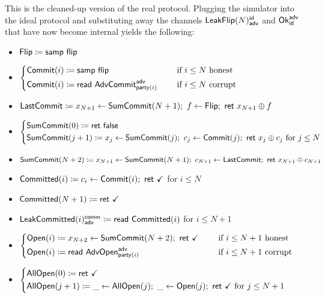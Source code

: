 \noindent This is the cleaned-up version of the real protocol. Plugging the simulator into the ideal protocol and substituting away the channels $\mathsf{LeakFlip}(N)^{\mathsf{id}}_{\mathsf{adv}}$ and $\mathsf{Ok}^{\mathsf{adv}}_{\mathsf{id}}$ that have now become internal yields the following:

\begin{itemize}
\item $\mathsf{Flip} \coloneqq \mathsf{samp} \ \mathsf{flip}$
\item {\color{blue} $\begin{cases*} \Commit(i) \coloneqq \samp{\flip} & \hspace{10pt} \text{if $i \leq N$ honest} \\ \Commit(i) \coloneqq \read{\AdvCommit^\adv_{\party(i)}} & \hspace{10pt} \text{if $i \leq N$ corrupt} \end{cases*}$}
\item {\color{blue} $\mathsf{LastCommit} \coloneqq x_{N+1} \leftarrow \mathsf{SumCommit}(N+1); \ f \leftarrow \mathsf{Flip}; \ \mathsf{ret} \ x_{N+1} \oplus f$}
\item {\color{blue} $\begin{cases*} \SumCommit(0) \coloneqq \ret{\false} \\ \SumCommit(j+1) \coloneqq x_j \leftarrow \SumCommit(j); \ c_j \leftarrow \Commit(j); \ \ret{x_j \oplus c_j} \text{ for $j \leq N$} \end{cases*}$}
\item {\color{blue} $\SumCommit(N+2) \coloneqq x_{N+1} \leftarrow \SumCommit(N+1); \ c_{N+1} \leftarrow \LastCommit; \ \ret{x_{N+1} \oplus c_{N+1}}$}
\item {\color{magenta} $\mathsf{Committed}(i) \coloneqq c_i \leftarrow \mathsf{Commit}(i); \ \mathsf{ret} \ \checkmark$ for $i \leq N$}
\item {\color{magenta} $\mathsf{Committed}(N+1) \coloneqq \mathsf{ret} \ \checkmark$}
\item {\color{magenta} $\mathsf{LeakCommitted}(i)^{\mathsf{comm}}_{\mathsf{adv}} \coloneqq \mathsf{read} \ \mathsf{Committed}(i)$ for $i \leq N+1$}
\item {\color{teal} $\begin{cases*} \Open(i) \coloneqq x_{N+2} \leftarrow \SumCommit(N+2); \ \ret{\checkmark} & \hspace{10pt} \text{if $i \leq N+1$ honest} \\ \Open(i) \coloneqq \read{\AdvOpen^\adv_{\party(i)}} & \hspace{10pt} \text{if $i \leq N+1$ corrupt} \end{cases*}$}
\item {\color{teal} $\begin{cases*} \AllOpen(0) \coloneqq \ret{\checkmark} \\ \AllOpen(j+1) \coloneqq \_ \leftarrow \AllOpen(j); \ \_ \leftarrow \Open(j); \ \ret{\checkmark} \text{ for $j \leq N+1$} \end{cases*}$}

\end{itemize}

